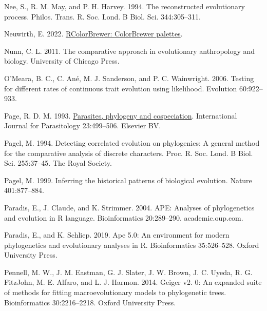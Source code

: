 \documentclass[fleqn,10pt,lineno]{wlpeerj} %
\newlength{\cslhangindent}
\newlength{\cslentryspacingunit} %
\newenvironment{CSLReferences}[2] %
 {%
  \setlength{\parindent}{0pt}
  \ifodd #1
  \let\oldpar\par
  \def\par{\hangindent=\cslhangindent\oldpar}
  \fi
  \setlength{\parskip}{#2\cslentryspacingunit}
 }%
 {}
\begin{document}
\begin{CSLReferences}{1}{0}
\leavevmode{}%
Nee, S., R. M. May, and P. H. Harvey. 1994. The reconstructed evolutionary process. Philos. Trans. R. Soc. Lond. B Biol. Sci. 344:305--311.

\leavevmode{}%
Neuwirth, E. 2022. \href{https://CRAN.R-project.org/package=RColorBrewer}{RColorBrewer: ColorBrewer palettes}.

\leavevmode{}%
Nunn, C. L. 2011. The comparative approach in evolutionary anthropology and biology. University of Chicago Press.

\leavevmode{}%
O'Meara, B. C., C. Ané, M. J. Sanderson, and P. C. Wainwright. 2006. Testing for different rates of continuous trait evolution using likelihood. Evolution 60:922--933.

\leavevmode{}%
Page, R. D. M. 1993. \href{https://doi.org/10.1016/0020-7519(93)90039-2}{Parasites, phylogeny and cospeciation}. International Journal for Parasitology 23:499--506. Elsevier {BV}.

\leavevmode{}%
Pagel, M. 1994. Detecting correlated evolution on phylogenies: A general method for the comparative analysis of discrete characters. Proc. R. Soc. Lond. B Biol. Sci. 255:37--45. The Royal Society.

\leavevmode{}%
Pagel, M. 1999. Inferring the historical patterns of biological evolution. Nature 401:877--884.

\leavevmode{}%
Paradis, E., J. Claude, and K. Strimmer. 2004. {APE}: Analyses of phylogenetics and evolution in {R} language. Bioinformatics 20:289--290. academic.oup.com.

\leavevmode{}%
Paradis, E., and K. Schliep. 2019. Ape 5.0: An environment for modern phylogenetics and evolutionary analyses in {R}. Bioinformatics 35:526--528. Oxford University Press.

\leavevmode{}%
Pennell, M. W., J. M. Eastman, G. J. Slater, J. W. Brown, J. C. Uyeda, R. G. FitzJohn, M. E. Alfaro, and L. J. Harmon. 2014. Geiger v2. 0: An expanded suite of methods for fitting macroevolutionary models to phylogenetic trees. Bioinformatics 30:2216--2218. Oxford University Press.


\end{CSLReferences}
\end{document}
